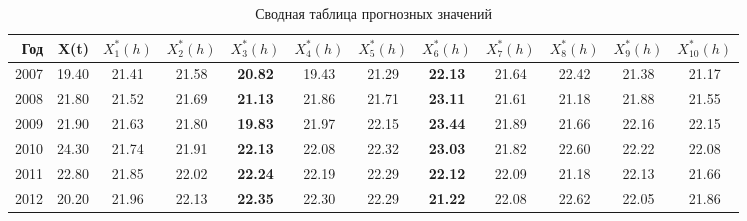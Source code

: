 \begin{table}[ht]
\centering
\caption{Сводная таблица прогнозных значений} 
\label{table:summary-prediction}
{\footnotesize
\begin{tabular}{r|rcccccccccc}
  \hline
Год & X(t) & $ X^{*}_1(h) $ & $ X^{*}_2(h) $ & \boldmath$ X^{*}_3(h) $ & $ X^{*}_4(h) $ & $ X^{*}_5(h) $ & \boldmath$ X^{*}_6(h) $ & $ X^{*}_7(h) $ & $ X^{*}_8(h) $ & $ X^{*}_9(h) $ & $ X^{*}_{10}(h) $ \\ 
  \hline
2007 & 19.40 & 21.41 & 21.58 & \textbf{20.82} & 19.43 & 21.29 & \textbf{22.13} & 21.64 & 22.42 & 21.38 & 21.17 \\ 
  2008 & 21.80 & 21.52 & 21.69 & \textbf{21.13} & 21.86 & 21.71 & \textbf{23.11} & 21.61 & 21.18 & 21.88 & 21.55 \\ 
  2009 & 21.90 & 21.63 & 21.80 & \textbf{19.83} & 21.97 & 22.15 & \textbf{23.44} & 21.89 & 21.66 & 22.16 & 22.15 \\ 
  2010 & 24.30 & 21.74 & 21.91 & \textbf{22.13} & 22.08 & 22.32 & \textbf{23.03} & 21.82 & 22.60 & 22.22 & 22.08 \\ 
  2011 & 22.80 & 21.85 & 22.02 & \textbf{22.24} & 22.19 & 22.29 & \textbf{22.12} & 22.09 & 21.18 & 22.13 & 21.66 \\ 
  2012 & 20.20 & 21.96 & 22.13 & \textbf{22.35} & 22.30 & 22.29 & \textbf{21.22} & 22.08 & 22.62 & 22.05 & 21.86 \\ 
   \hline
\end{tabular}
}
\end{table}
